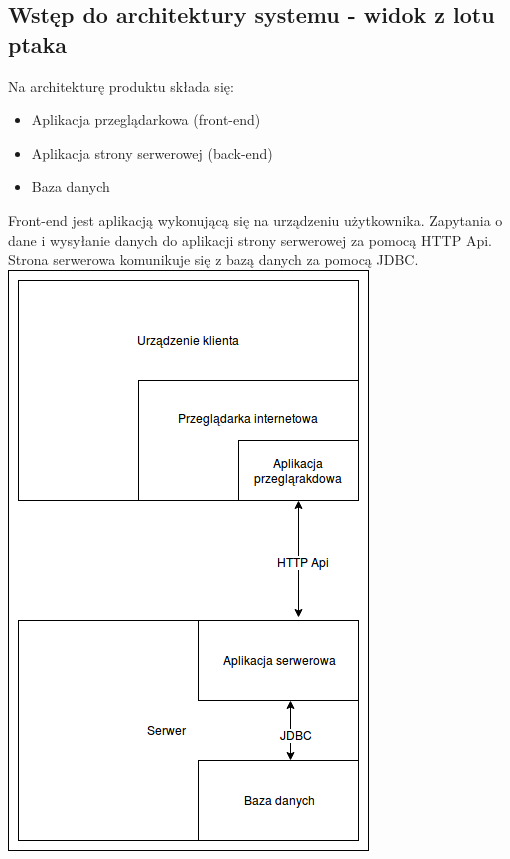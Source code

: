 \documentclass[polish,12pt]{aghthesis}
\begin{document}
\subsection{Wstęp do architektury systemu - widok z lotu ptaka}
Na architekturę produktu składa się:
\begin{itemize}
    \item Aplikacja przeglądarkowa (front-end)
    \item Aplikacja strony serwerowej (back-end)
    \item Baza danych
\end{itemize}
Front-end jest aplikacją wykonującą się na urządzeniu użytkownika. Zapytania o dane i wysyłanie danych do aplikacji strony serwerowej za pomocą HTTP Api. Strona serwerowa komunikuje się z bazą danych za pomocą JDBC.
\includegraphics{komunikacja-serwer-klient-okolny}
\end{document}
